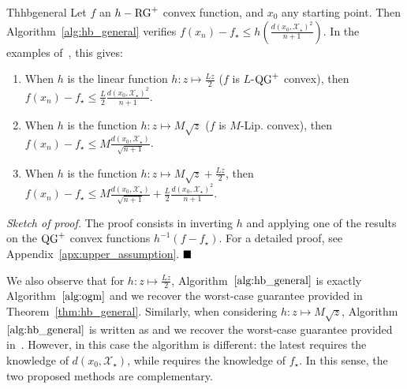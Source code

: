         \begin{center}
            \begin{restatable}{Th}{hbgeneral}\textbf{\emph{\label{thm:hb_general}}}
                Let $f$ an $h-\operatorname{RG}^+$ convex function, and $x_0$ any starting point.
                Then Algorithm~\ref{alg:hb_general} verifies
                    $f(x_n) - f_\star \leq h\left(\frac{d(x_0, \mathcal{X}_\star)^2}{n+1} \right).$
                In the examples of~, this gives:
                \begin{enumerate}[noitemsep, topsep=1pt,leftmargin=*]
                    \item When $h$ is the linear function $h: z \mapsto \frac{Lz}{2}$ ($f$ is $L$-$\operatorname{QG}^+$ convex), then $f(x_n) - f_\star \leq \frac{L}{2}\frac{d(x_0, \mathcal{X}_\star)^2}{n+1}$.
                    \item When $h$ is the function $h: z \mapsto M\sqrt{z}$ ($f$ is $M$-Lip. convex), then $f(x_n) - f_\star \leq M\frac{d(x_0, \mathcal{X}_\star)}{\sqrt{n+1}}$.
                    \item When $h$ is the function $h: z \mapsto M\sqrt{z} + \frac{Lz}{2}$, then $f(x_n) - f_\star \leq M\frac{d(x_0, \mathcal{X}_\star)}{\sqrt{n+1}} + \frac{L}{2}\frac{d(x_0, \mathcal{X}_\star)^2}{n+1}$.
                \end{enumerate}
            \end{restatable}
        \end{center}

        \noindent \textit{Sketch of proof.}
        The proof consists in inverting $h$ and applying one of the results on the $\operatorname{QG}^+$ convex functions $h^{-1}\left( f - f_\star \right)$.
        For a detailed proof, see Appendix~\ref{apx:upper_assumption}.
        $\hfill\blacksquare$

        We also observe that for $h: z \mapsto \frac{Lz}{2}$, Algorithm~$\ref{alg:hb_general}$ is exactly Algorithm~$\ref{alg:ogm}$ and we recover the worst-case guarantee provided in Theorem~\ref{thm:hb_general}.
        Similarly, when considering $h: z \mapsto M\sqrt{z}$, Algorithm~$\ref{alg:hb_general}$ is written as  and we recover the worst-case guarantee provided in~\citep[Cor. 3]{drori2020efficient}.
        However, in this case the algorithm is different: the latest requires the knowledge of $d(x_0, \mathcal{X}_\star)$, while  requires the knowledge of $f_\star$.
        In this sense, the two proposed methods are complementary.

